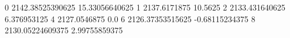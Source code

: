 0 2142.38525390625 15.33056640625
1 2137.6171875 10.5625
2 2133.431640625 6.376953125
4 2127.0546875 0.0
6 2126.37353515625 -0.68115234375
8 2130.05224609375 2.99755859375
